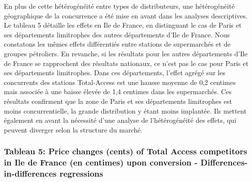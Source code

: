 \documentclass[english]{article}
\begin{document}
En plus de cette hétérogénéité entre types de distributeurs, une hétérogénéité géographique de la concurrence a été mise en avant dans les analyses descriptives. Le tableau 5 détaille les effets en Ile de France, en distinguant le cas de Paris et ses départements limitrophes des autres départements d’Ile de France. Nous constatons les mêmes effets différentiés entre stations de supermarchés et de groupes pétroliers. En revanche, si les résultats pour les autres départements d’Ile de France se rapprochent des résultats nationaux, ce n’est pas le cas pour Paris et ses départements limitrophes. Dans ces départements, l’effet agrégé sur les concurrents des stations Total-Access est une hausse moyenne de 0,2 centimes mais
associée à une baisse élevée de 1,4 centimes dans les supermarchés. Ces résultats confirment que la zone de Paris et ses départements limitrophes est moins concurrentielle, la grande distribution y étant moins implantée. Ils mettent également en avant la nécessité d’une analyse de l’hétérogénéité des effets, qui peuvent diverger selon la structure du marché.

\medskip{}

\subsubsection*{Tableau 5: Price changes (cents) of Total Access competitors
in Ile de France (en centimes) upon conversion - Differences-in-differences regressions}
\end{document}

